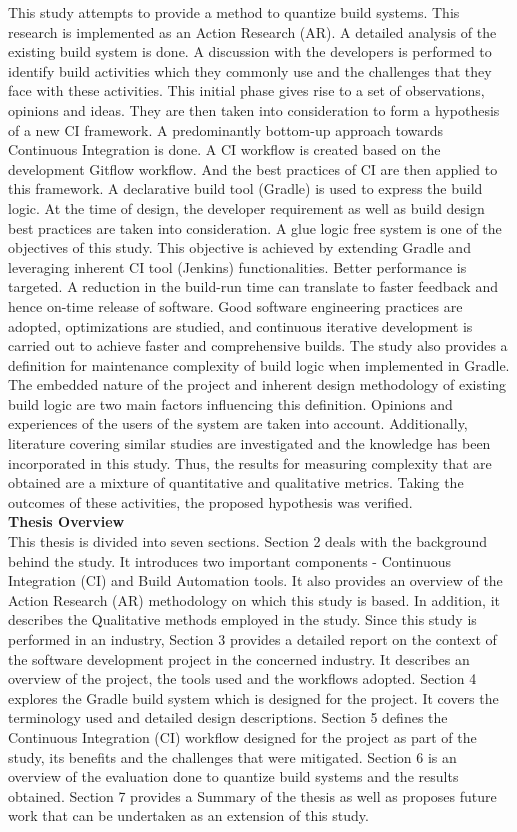\documentclass[12pt, a4paper, titlepage]{scrartcl}
\begin{document}
\par This study attempts to provide a method to quantize build systems. This research is implemented as an Action Research (AR). A detailed analysis of the existing build system is done. A discussion with the developers is performed to identify build activities which they commonly use and the challenges that they face with these activities. This initial phase gives rise to a set of observations, opinions and ideas. They are then taken into consideration to form a hypothesis of a new CI framework. A predominantly bottom-up approach towards Continuous Integration is done. A CI workflow is created based on the development Gitflow workflow. And the best practices of CI are then applied to this framework. A declarative build tool (Gradle) is used to express the build logic. At the time of design, the developer requirement as well as build design best practices are taken into consideration. A glue logic free system is one of the objectives of this study. This objective is achieved by extending Gradle and leveraging inherent CI tool (Jenkins) functionalities. Better performance is targeted. A reduction in the build-run time can translate to faster feedback and hence on-time release of software. Good software engineering practices are adopted, optimizations are studied, and continuous iterative development is carried out to achieve faster and comprehensive builds. The study also provides a definition for maintenance complexity of build logic when implemented in Gradle. The embedded nature of the project and inherent design methodology of existing build logic are two main factors influencing this definition. Opinions and experiences of the users of the system are taken into account. Additionally, literature covering similar studies are investigated and the knowledge has been incorporated in this study. Thus, the results for measuring complexity that are obtained are a mixture of quantitative and qualitative metrics. Taking the outcomes of these activities, the proposed hypothesis was verified. 
\\
\linebreak
\textbf{Thesis Overview} \\
This thesis is divided into seven sections. Section 2 deals with the background behind the study. It introduces two important components - Continuous Integration (CI) and Build Automation tools. It also provides an overview of the Action Research (AR) methodology on which this study is based. In addition, it describes the Qualitative methods employed in the study. Since this study is performed in an industry, Section 3 provides a detailed report on the context of the software development project in the concerned industry. It describes an overview of the project, the tools used and the workflows adopted. Section 4 explores the Gradle build system which is designed for the project. It covers the terminology used and detailed design descriptions. Section 5 defines the Continuous Integration (CI) workflow designed for the project as part of the study, its benefits and the challenges that were mitigated. Section 6 is an overview of the evaluation done to quantize build systems and the results obtained. Section 7 provides a Summary of the thesis as well as proposes future work that can be undertaken as an extension of this study. 
\pagebreak
\end{document}
